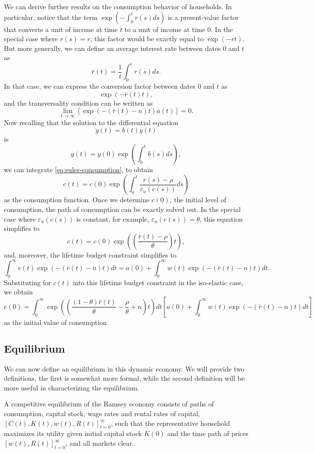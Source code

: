 \documentclass[\topdir/lecture\_notes.tex]{subfiles}
\begin{document}
We can derive further results on the consumption behavior of households. In particular, notice that the term \(\exp \left(-\int_{0}^{t} r(s) ds\right)\) is a present-value factor that converts a unit of income at time \(t\) to a unit of income at time 0. In the special case where \(r(s)=r\), this factor would be exactly equal to \(\exp(-rt)\). But more generally, we can define an average interest rate between dates 0 and \(t\) as
\[
  \bar{r}(t)=\frac{1}{t} \int_{0}^{t} r(s) ds.
\]
In that case, we can express the conversion factor between dates 0 and \(t\) as
\[
  \exp(-\bar{r}(t) t),
\]
and the transversality condition can be written as
\[
  \lim _{t \rightarrow \infty}[\exp(-(\bar{r}(t)-n) t) a(t)]=0.
\]
Now recalling that the solution to the differential equation
\[
  \dot{y}(t)=b(t) y(t)
\]
is
\[
  y(t)=y(0) \exp \left(\int_{0}^{t} b(s) ds\right),
\]
we can integrate \eqref{eq:euler-consumption}, to obtain
\[
  c(t)=c(0) \exp \left(\int_{0}^{t} \frac{r(s)-\rho}{\varepsilon_{u}(c(s))} ds\right)
\]
as the consumption function. Once we determine \(c(0)\), the initial level of consumption, the path of consumption can be exactly solved out. In the special case where \(\varepsilon_{u}(c(s))\) is constant,
for example, \(\varepsilon_{u}(c(s))=\theta\), this equation simplifies to
\[
  c(t)=c(0) \exp \left(\left(\frac{\bar{r}(t)-\rho}{\theta}\right) t\right),
\]
and, moreover, the lifetime budget constraint simplifies to
\[
  \int_{0}^{\infty} c(t) \exp(-(\bar{r}(t)-n) t) dt=a(0)+\int_{0}^{\infty} w(t) \exp(-(\bar{r}(t)-n) t) dt.
\]
Substituting for \(c(t)\) into this lifetime budget constraint in the iso-elastic case, we obtain
\[
  c(0)=\int_{0}^{\infty} \exp \left(\left(\frac{(1-\theta) \bar{r}(t)}{\theta}-\frac{\rho}{\theta}+n\right) t\right) dt\left[a(0)+\int_{0}^{\infty} w(t) \exp(-(\bar{r}(t)-n) t) dt\right]
\]
as the initial value of consumption.

\subsection{Equilibrium}
We can now define an equilibrium in this dynamic economy.
We will provide two definitions, the first is somewhat more formal, while the second definition will be more useful in characterizing the equilibrium.

\begin{defn}\label{def:competitive-equilibrium-1}
  A competitive equilibrium of the Ramsey economy consists of paths of consumption, capital stock, wage rates and rental rates of capital, \([C(t), K(t), w(t), R(t)]_{t=0}^{\infty}\), such that the representative household maximizes its utility given initial capital stock \(K(0)\) and the time path of prices \([w(t), R(t)]_{t=0}^{\infty}\), and all markets clear.
\end{defn}
\end{document}

